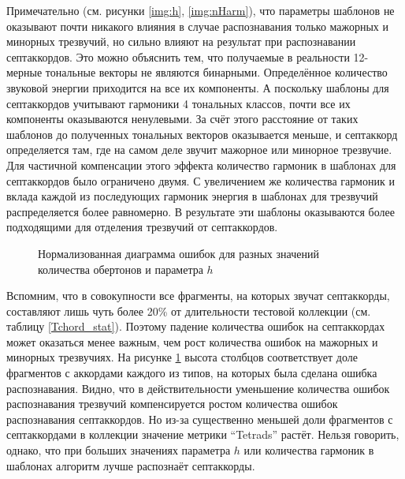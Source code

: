 Примечательно (см. рисунки \ref{img:h}, \ref{img:nHarm}), что параметры шаблонов
не оказывают почти никакого влияния в случае распознавания только мажорных и
минорных трезвучий, но сильно влияют на результат при распознавании
септаккордов. Это можно объяснить тем, что получаемые в реальности 12-мерные
тональные векторы не являются бинарными. Определённое количество звуковой
энергии приходится на все их компоненты. А поскольку шаблоны для септаккордов
учитывают гармоники 4 тональных классов, почти все их компоненты оказываются
ненулевыми. За счёт этого расстояние от таких шаблонов до полученных тональных
векторов оказывается меньше, и септаккорд определяется там, где на самом деле
звучит мажорное или минорное трезвучие. Для частичной компенсации этого эффекта
количество гармоник в шаблонах для септаккордов было ограничено двумя. С
увеличением же количества гармоник и вклада каждой из последующих гармоник
энергия в шаблонах для трезвучий распределяется более равномерно. В результате
эти шаблоны оказываются более подходящими для отделения трезвучий от
септаккордов.

\begin{figure}[htbp]
  \begin{minipage}[h]{0.49\linewidth}
  \end{minipage}
  \hfill
  \begin{minipage}[h]{0.49\linewidth}
  \end{minipage}
  \caption{Нормализованная диаграмма ошибок для разных значений количества
  обертонов и параметра $h$}
  \label{img:nHarmh_n}
\end{figure}

Вспомним, что в совокупности все фрагменты, на которых звучат септаккорды,
составляют лишь чуть более 20\% от длительности тестовой коллекции (см. таблицу
\ref{Tchord_stat}). Поэтому падение количества ошибок на септаккордах может
оказаться менее важным, чем рост количества ошибок на мажорных и минорных
трезвучиях. На рисунке \ref{img:nHarmh_n} высота столбцов соответствует доле
фрагментов с аккордами каждого из типов, на которых была сделана ошибка
распознавания. Видно, что в действительности уменьшение количества ошибок
распознавания трезвучий компенсируется ростом количества ошибок распознавания
септаккордов. Но из-за существенно меньшей доли фрагментов с септаккордами в
коллекции значение метрики ``Tetrads'' растёт. Нельзя говорить, однако, что при
больших значениях параметра $h$ или количества гармоник в шаблонах алгоритм
лучше распознаёт септаккорды.

